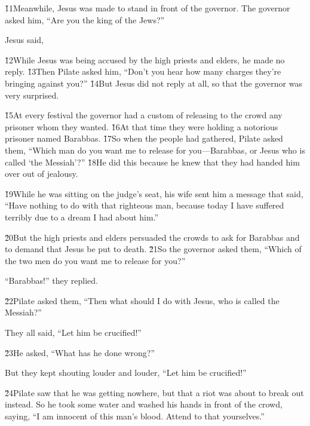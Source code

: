 \v{11}Meanwhile, Jesus was made to stand in front of the governor. The governor asked him, ``Are you the king of the Jews?''

Jesus said, 

\v{12}While Jesus was being accused by the high priests and elders, he made no reply. \v{13}Then Pilate asked him, ``Don't you hear how many charges they're bringing against you?'' \v{14}But Jesus did not reply at all, so that the governor was very surprised.

\v{15}At every festival the governor had a custom of releasing to the crowd any prisoner whom they wanted. \v{16}At that time they were holding a notorious prisoner named Barabbas. \v{17}So when the people had gathered, Pilate asked them, ``Which man do you want me to release for you---Barabbas, or Jesus who is called `the Messiah'?'' \v{18}He did this because he knew that they had handed him over out of jealousy.

\v{19}While he was sitting on the judge's seat, his wife sent him a message that said, ``Have nothing to do with that righteous man, because today I have suffered terribly due to a dream I had about him.''

\v{20}But the high priests and elders persuaded the crowds to ask for Barabbas and to demand that Jesus be put to death. \v{21}So the governor asked them, ``Which of the two men do you want me to release for you?''

``Barabbas!'' they replied.

\v{22}Pilate asked them, ``Then what should I do with Jesus, who is called the Messiah?''

They all said, ``Let him be crucified!''

\v{23}He asked, ``What has he done wrong?''

But they kept shouting louder and louder, ``Let him be crucified!''

\v{24}Pilate saw that he was getting nowhere, but that a riot was about to break out instead. So he took some water and washed his hands in front of the crowd, saying, ``I am innocent of this man's blood. Attend to that yourselves.''

